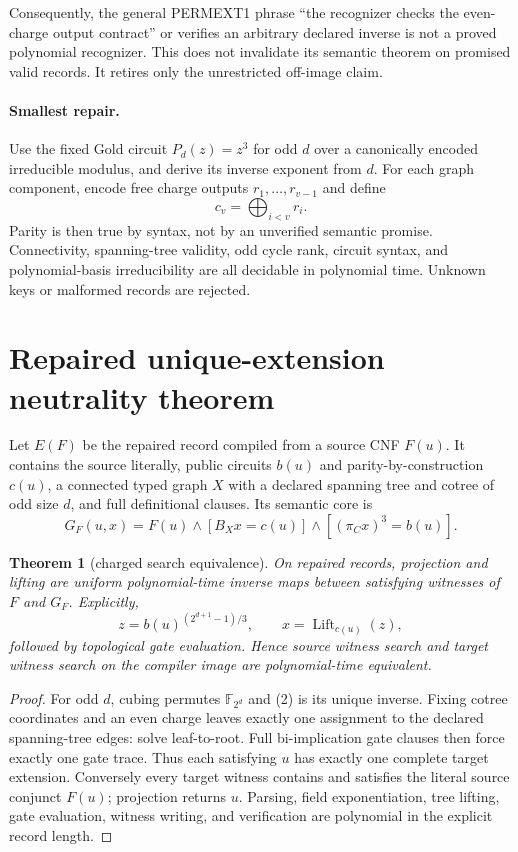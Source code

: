 \documentclass[11pt]{article}
\newtheorem{theorem}{Theorem}
\begin{document}
Consequently, the general PERMEXT1 phrase ``the recognizer checks the
even-charge output contract'' or verifies an arbitrary declared inverse is not
a proved polynomial recognizer.  This does not invalidate its semantic theorem
on promised valid records.  It retires only the unrestricted off-image claim.

\paragraph{Smallest repair.}
Use the fixed Gold circuit $P_d(z)=z^3$ for odd $d$ over a canonically encoded
irreducible modulus, and derive its inverse exponent from $d$.  For each graph
component, encode free charge outputs $r_1,\ldots,r_{v-1}$ and define
\[
 c_v=\bigoplus_{i<v}r_i.
\]
Parity is then true by syntax, not by an unverified semantic promise.
Connectivity, spanning-tree validity, odd cycle rank, circuit syntax, and
polynomial-basis irreducibility are all decidable in polynomial time.  Unknown
keys or malformed records are rejected.

\section{Repaired unique-extension neutrality theorem}
Let $E(F)$ be the repaired record compiled from a source CNF $F(u)$.  It
contains the source literally, public circuits $b(u)$ and parity-by-construction
$c(u)$, a connected typed graph $X$ with a declared spanning tree and cotree
of odd size $d$, and full definitional clauses.  Its semantic core is
\[
 G_F(u,x)=F(u)\land[B_Xx=c(u)]
                \land[(\pi_Cx)^3=b(u)].                 \tag{1}
\]

\begin{theorem}[charged search equivalence]
On repaired records, projection and lifting are uniform polynomial-time
inverse maps between satisfying witnesses of $F$ and $G_F$.  Explicitly,
\[
 z=b(u)^{(2^{d+1}-1)/3},\qquad
 x=\operatorname{Lift}_{c(u)}(z),                       \tag{2}
\]
followed by topological gate evaluation.  Hence source witness search and
target witness search on the compiler image are polynomial-time equivalent.
\end{theorem}
\begin{proof}
For odd $d$, cubing permutes $\mathbb F_{2^d}$ and (2) is its unique inverse.
Fixing cotree coordinates and an even charge leaves exactly one assignment to
the declared spanning-tree edges: solve leaf-to-root.  Full bi-implication
gate clauses then force exactly one gate trace.  Thus each satisfying $u$ has
exactly one complete target extension.  Conversely every target witness
contains and satisfies the literal source conjunct $F(u)$; projection returns
$u$.  Parsing, field exponentiation, tree lifting, gate evaluation, witness
writing, and verification are polynomial in the explicit record length.
\end{proof}
\end{document}
